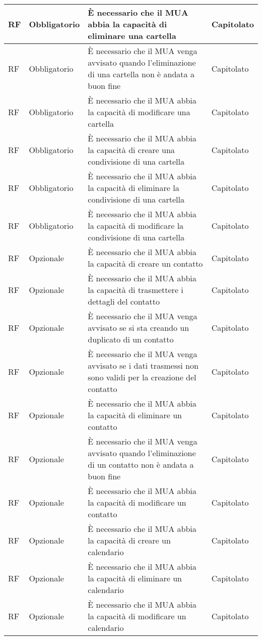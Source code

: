 \begin{table}[H]
\begin{tabular}{*{1}{>{\centering\arraybackslash}p{1.5cm}}*{1}{>{\centering\arraybackslash}p{2.5cm}}p{6cm}*{1}{>{\centering\arraybackslash}p{3cm}}}
    RF & Obbligatorio & È necessario che il MUA abbia la capacità di eliminare una cartella & Capitolato
    \\\midrule 
    RF & Obbligatorio & È necessario che il MUA venga avvisato quando l'eliminazione di una cartella non è andata a buon fine & Capitolato
    \\\midrule
    RF & Obbligatorio & È necessario che il MUA abbia la capacità di modificare una cartella & Capitolato
    \\\midrule 
    RF & Obbligatorio & È necessario che il MUA abbia la capacità di creare una condivisione di una cartella & Capitolato
    \\\midrule 
    RF & Obbligatorio & È necessario che il MUA abbia la capacità di eliminare la condivisione di una cartella & Capitolato
    \\\midrule
    RF & Obbligatorio & È necessario che il MUA abbia la capacità di modificare la condivisione di una cartella & Capitolato
    \\\midrule
    RF & Opzionale & È necessario che il MUA abbia la capacità di creare un contatto & Capitolato
    \\\midrule
    RF & Opzionale & È necessario che il MUA abbia la capacità di trasmettere i dettagli del contatto & Capitolato
    \\\midrule 
    RF & Opzionale & È necessario che il MUA venga avvisato se si sta creando un duplicato di un contatto & Capitolato
    \\\midrule 
    RF & Opzionale & È necessario che il MUA venga avvisato se i dati trasmessi non sono validi per la creazione del contatto & Capitolato
    \\\midrule
    RF & Opzionale & È necessario che il MUA abbia la capacità di eliminare un contatto & Capitolato
    \\\midrule
    RF & Opzionale & È necessario che il MUA venga avvisato quando l'eliminazione di un contatto non è andata a buon fine & Capitolato
    \\\midrule
    RF & Opzionale & È necessario che il MUA abbia la capacità di modificare un contatto & Capitolato
    \\\midrule %
    RF & Opzionale & È necessario che il MUA abbia la capacità di creare un calendario & Capitolato
    \\\midrule
    RF & Opzionale & È necessario che il MUA abbia la capacità di eliminare un calendario & Capitolato
    \\\midrule
    RF & Opzionale & È necessario che il MUA abbia la capacità di modificare un calendario & Capitolato

\end{tabular}
\end{table}
